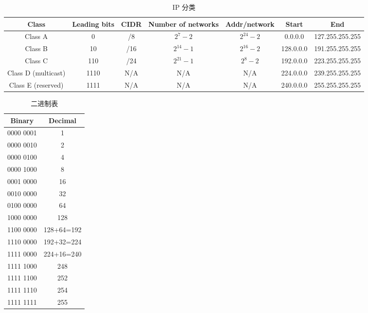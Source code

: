 \documentclass[a4paper]{report}
\begin{document}
{
  \tiny
\begin{table}[htbp]
  \centering
    \begin{tabular}{ccccccc}
      \hline
    Class & Leading bits & CIDR & Number of networks & Addr/network & Start & End \\
    \hline
    Class A & 0     & /8    & $2^7-2$ & $2^{24}-2$ & 0.0.0.0 & 127.255.255.255 \\
    Class B & 10    & /16   & $2^{14}-1$ & $2^{16}-2$ & 128.0.0.0 & 191.255.255.255 \\
    Class C & 110   & /24   & $2^{21}-1$ & $2^8-2$ & 192.0.0.0 & 223.255.255.255 \\
    Class D (multicast) & 1110  & N/A & N/A & N/A & 224.0.0.0 & 239.255.255.255 \\
    Class E (reserved) & 1111  & N/A & N/A & N/A & 240.0.0.0 & 255.255.255.255 \\
    \hline
    \end{tabular}%
  \label{tab:ip_class}%
  \caption{IP 分类}
\end{table}%
}
{\tiny
\begin{table}[htbp]
  \centering
    \begin{tabular}{cc}
      \hline
    Binary & Decimal \\
    \hline
    0000 0001 & 1 \\
    0000 0010 & 2 \\
    0000 0100 & 4 \\
    0000 1000 & 8 \\
    0001 0000 & 16 \\
    0010 0000 & 32 \\
    0100 0000 & 64 \\
    1000 0000 & 128 \\
    1100 0000 & 128+64=192 \\
    1110 0000 & 192+32=224 \\
    1111 0000 & 224+16=240 \\
    1111 1000 & 248 \\
    1111 1100 & 252 \\
    1111 1110 & 254 \\
    1111 1111 & 255 \\
    \hline
    \end{tabular}%
  \caption{二进制表}
  \label{tab:binary_table}%
\end{table}%

}
\end{document}
